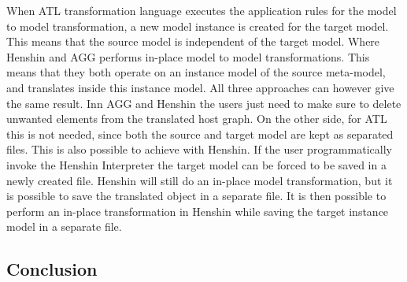 When ATL transformation language executes the application rules for the model to
model transformation, a new model instance is created for the target model. This
means that the source model is independent of the target model. Where Henshin
and AGG performs in-place model to model transformations. This means that they
both operate on an instance model of the source meta-model, and translates
inside this instance model. All three approaches can however give the same
result. Inn AGG and Henshin the users just need to make sure to delete unwanted
elements from the translated host graph. On the other side, for ATL this is not
needed, since both the source and target model are kept as separated files. This
is also possible to achieve with Henshin. If the user programmatically invoke
the Henshin Interpreter the target model can be forced to be saved in a newly
created file. Henshin will still do an in-place model transformation, but it is
possible to save the translated object in a separate file. It is then possible
to perform an in-place transformation in Henshin while saving the target
instance model in a separate file. 

\subsection{Conclusion}

